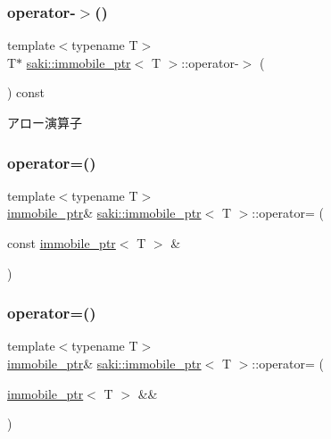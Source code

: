 \subsubsection{\texorpdfstring{operator-\/$>$()}{operator->()}}
{\footnotesize\ttfamily template$<$typename T$>$ \\
T$\ast$ \mbox{\hyperlink{classsaki_1_1immobile__ptr}{saki\+::immobile\+\_\+ptr}}$<$ T $>$\+::operator-\/$>$ (\begin{DoxyParamCaption}{ }\end{DoxyParamCaption}) const\hspace{0.3cm}{\ttfamily [inline]}}



アロー演算子 

\mbox{\label{classsaki_1_1immobile__ptr_aeda073b50b1e44b9aacf91ac6ba3891b}} 
\subsubsection{\texorpdfstring{operator=()}{operator=()}\hspace{0.1cm}{\footnotesize\ttfamily [1/2]}}
{\footnotesize\ttfamily template$<$typename T$>$ \\
\mbox{\hyperlink{classsaki_1_1immobile__ptr}{immobile\+\_\+ptr}}\& \mbox{\hyperlink{classsaki_1_1immobile__ptr}{saki\+::immobile\+\_\+ptr}}$<$ T $>$\+::operator= (\begin{DoxyParamCaption}\item[{const \mbox{\hyperlink{classsaki_1_1immobile__ptr}{immobile\+\_\+ptr}}$<$ T $>$ \&}]{ }\end{DoxyParamCaption})\hspace{0.3cm}{\ttfamily [delete]}}

\mbox{\label{classsaki_1_1immobile__ptr_a8b4e02a03c73cf8009248ebb0adfba7f}} 
\subsubsection{\texorpdfstring{operator=()}{operator=()}\hspace{0.1cm}{\footnotesize\ttfamily [2/2]}}
{\footnotesize\ttfamily template$<$typename T$>$ \\
\mbox{\hyperlink{classsaki_1_1immobile__ptr}{immobile\+\_\+ptr}}\& \mbox{\hyperlink{classsaki_1_1immobile__ptr}{saki\+::immobile\+\_\+ptr}}$<$ T $>$\+::operator= (\begin{DoxyParamCaption}\item[{\mbox{\hyperlink{classsaki_1_1immobile__ptr}{immobile\+\_\+ptr}}$<$ T $>$ \&\&}]{ }\end{DoxyParamCaption})\hspace{0.3cm}{\ttfamily [delete]}}

